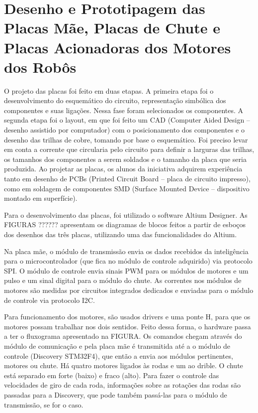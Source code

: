 \chapter{Desenho e Prototipagem das Placas Mãe, Placas de Chute e Placas Acionadoras dos Motores dos Robôs}\label{cap:design_placas}

O projeto das placas foi feito em duas etapas. A primeira etapa foi o desenvolvimento do esquemático do circuito, representação simbólica dos componentes e suas ligações. Nessa fase foram selecionados os componentes. A segunda etapa foi o layout, em que foi feito um CAD (Computer Aided Design ­– desenho assistido por computador) com o posicionamento dos componentes e o desenho das trilhas de cobre, tomando por base o esquemático. Foi preciso levar em conta a corrente que circularia pelo circuito para definir a larguras das trilhas, os tamanhos dos componentes a serem soldados e o tamanho da placa que seria produzida. Ao projetar as placas, os alunos da iniciativa adquirem experiência tanto em desenho de PCBs (Printed Circuit Board – placa de circuito impresso), como em soldagem de componentes SMD (Surface Mounted Device – dispositivo montado em superfície).

Para o desenvolvimento das placas, foi utilizado o software Altium Designer. As FIGURAS ?????? apresentam os diagramas de blocos feitos a partir de esboços dos desenhos das três placas, utilizando uma das funcionalidades do Altium.

Na placa mãe, o módulo de transmissão envia os dados recebidos da inteligência para o microcontrolador (que fica no módulo de controle adquirido) via protocolo SPI.
O módulo de controle envia sinais PWM para os módulos de motores e um pulso e um sinal digital para o módulo do chute. As correntes nos módulos de motores são medidas por circuitos integrados dedicados e enviadas para o módulo de controle via protocolo I2C.

Para funcionamento dos motores, são usados drivers e uma ponte H, para que os motores possam trabalhar nos dois sentidos.
Feito dessa forma, o hardware passa a ter o fluxograma apresentado na FIGURA. Os comandos chegam através do módulo de comunicação e pela placa mãe é transmitida até a o módulo de controle (Discovery STM32F4), que então a envia aos módulos pertinentes, motores ou chute. Há quatro motores ligados às rodas e um ao drible. O chute está separado em forte (baixo) e fraco (alto). Para fazer o controle das velocidades de giro de cada roda, informações sobre as rotações das rodas são passadas para a Discovery, que pode também passá-las para o módulo de transmissão, se for o caso.







